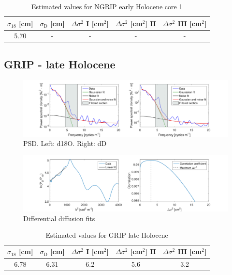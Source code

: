 \documentclass[11pt, draftcls, onecolumn]{IEEEtran} %
\numberwithin{equation}{section}
\numberwithin{table}{section}
\numberwithin{figure}{section}
\begin{document}
\begin{appendices}
\begin{table}[H]
	\center
	\caption{Estimated values for NGRIP early Holocene core 1}
	\label{NGRIP_early2_holo}
	\begin{tabular}{c c c c c} 
		\toprule
		$\sigma_{18}$ [cm] & $\sigma_\mathrm{D}$ [cm] & $\Delta\sigma^2$ I [cm$^2$] & $\Delta\sigma^2$ [cm$^2$] II & $\Delta\sigma^2$ III [cm$^2$] \\
		\midrule
		5.70 &   - &    - &     - &     - \\
		\bottomrule		
	\end{tabular}
\end{table}

\clearpage
\subsection{GRIP - late Holocene}

\begin{figure}[H]
	\vspace*{2mm}
	\begin{center}
		\includegraphics[width=1\textwidth]{Figure_19}
		\caption{PSD. Left: d18O. Right: dD}  \label{fig:GRIP_late_fig_1}
	\end{center}
\end{figure}

\begin{figure}[H]
	\vspace*{2mm}
	\begin{center}
		\includegraphics[width=1\textwidth]{Figure_20}
		\caption{Differential diffusion fits}  \label{fig:GRIP_late_fig_2}
	\end{center}
\end{figure}

\begin{table}[H]
	\center
	\caption{Estimated values for GRIP late Holocene}
	\label{GRIP_late_holo}
	\begin{tabular}{c c c c c} 
		\toprule
		$\sigma_{18}$ [cm] & $\sigma_\mathrm{D}$ [cm] & $\Delta\sigma^2$ I [cm$^2$] & $\Delta\sigma^2$ [cm$^2$] II & $\Delta\sigma^2$ III [cm$^2$] \\
		\midrule
6.78 &   6.31 &     6.2 &     5.6 &     3.2 \\
		\bottomrule		
	\end{tabular}
\end{table}


\end{appendices}
\end{document}
